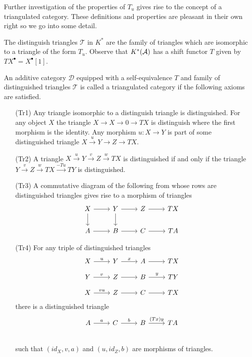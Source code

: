 Further investigation of the properties of $T_u$ gives rise to the concept of a triangulated category.
These definitions and properties are pleasant in their own right so we go into some detail.

The distinguish triangles $\mathcal{T}$ in $K^*$ are the family of triangles which are isomorphic to a triangle of the form $T_u$.
Observe that $K^*(\AA)$ has a shift functor $T$ given by $TX^\bullet = X^\bullet[1]$.
\begin{definition}
  An additive category $\mathcal{D}$ equipped with a self-equivalence $T$ and family of distinguished triangles $\mathcal{T}$ is called a triangulated category if the following axioms are satisfied.
  \begin{enumerate}
    \item[(Tr1)] Any triangle isomorphic to a distinguish triangle is distinguished. For any object $X$ the triangle $X\to X \to 0 \to TX$ is distinguish where the first morphism is the identity.
    Any morphism $u:X\to Y$ is part of some distinguished triangle $X\xrightarrow{u} Y \to Z \to TX$.
    \item[(Tr2)] A triangle $X\xrightarrow{u} Y \xrightarrow{v} Z \xrightarrow{w} TX$ is distinguished if and only if the triangle $Y \xrightarrow{v} Z \xrightarrow{w} TX \xrightarrow{-Tu} TY$ is distinguished.
    \item[(Tr3)] A commutative diagram of the following from whose rows are distinguished triangles gives rise to a morphism of triangles
    $$
      \begin{tikzcd}
        X\arrow{d}\rar& Y\arrow{d}\rar & Z\rar & TX\\
        A\rar& B\rar & C\rar & TA
      \end{tikzcd}
     $$
    \item[(Tr4)] For any triple of distinguished triangles
    $$
      \begin{tikzcd}[row sep=small]
        X \arrow{r}{u} & Y \arrow{r}{x}& A \arrow{r}{} & TX \\
        Y \arrow{r}{v} & Z \arrow{r}{}& B \arrow{r}{y} & TY\\
        X \arrow{r}{vu} & Z\arrow{r}{} & C\arrow{r}{} & TX
      \end{tikzcd}
    $$
    there is a distinguished triangle
    $$\begin{tikzcd}
      A \arrow{r}{a} & C \arrow{r}{b}& B \arrow{r}{(Tx)y} & TA \\
    \end{tikzcd} $$
    such that $(id_X, v,a)$ and $(u,id_Z,b)$ are morphisms of triangles.
    \end{enumerate}
\end{definition}
